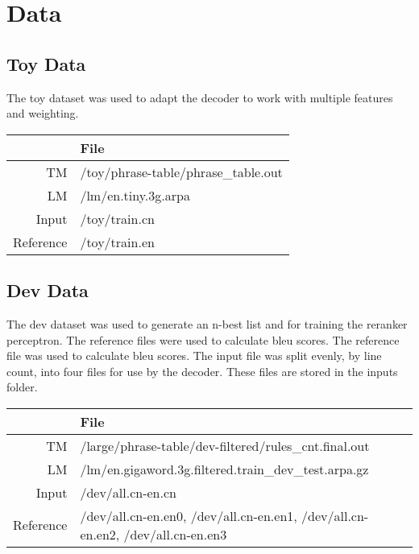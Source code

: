 \documentclass[letterpaper]{article}
\begin{document}
\section{Data}

\subsection{Toy Data}

\indent \indent The toy dataset was used to adapt the decoder to work with multiple features and weighting.

\begin{center}
    \begin{tabular}{|r|l|}
        \hline
         & File\\
        \hline
        TM & /toy/phrase-table/phrase\_table.out\\
        \hline
        LM & /lm/en.tiny.3g.arpa\\
        \hline
        Input & /toy/train.cn\\
        \hline
        Reference & /toy/train.en\\
        \hline
    \end{tabular}
\end{center}

\subsection{Dev Data}

\indent \indent The dev dataset was used to generate an n-best list and for training the reranker perceptron. The reference files were used to calculate bleu scores. The reference file was used to calculate bleu scores. The input file was split evenly, by line count, into four files for use by the decoder. These files are stored in the inputs folder.

\begin{center}
    \begin{tabular}{|r|l|}
        \hline
         & File\\
        \hline
        TM & /large/phrase-table/dev-filtered/rules\_cnt.final.out\\
        \hline
        LM & /lm/en.gigaword.3g.filtered.train\_dev\_test.arpa.gz\\
        \hline
        Input & /dev/all.cn-en.cn\\
        \hline
        Reference & /dev/all.cn-en.en0, /dev/all.cn-en.en1, /dev/all.cn-en.en2, /dev/all.cn-en.en3\\
        \hline
    \end{tabular}
\end{center}
\end{document}
